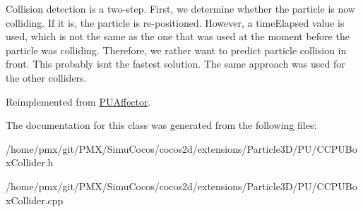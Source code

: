 Collision detection is a two-\/step. First, we determine whether the particle is now colliding. If it is, the particle is re-\/positioned. However, a time\+Elapsed value is used, which is not the same as the one that was used at the moment before the particle was colliding. Therefore, we rather want to predict particle collision in front. This probably isn\textquotesingle{}t the fastest solution. The same approach was used for the other colliders.

Reimplemented from \hyperlink{classPUAffector}{P\+U\+Affector}.



The documentation for this class was generated from the following files\+:\begin{DoxyCompactItemize}
\item 
/home/pmx/git/\+P\+M\+X/\+Simu\+Cocos/cocos2d/extensions/\+Particle3\+D/\+P\+U/C\+C\+P\+U\+Box\+Collider.\+h\item 
/home/pmx/git/\+P\+M\+X/\+Simu\+Cocos/cocos2d/extensions/\+Particle3\+D/\+P\+U/C\+C\+P\+U\+Box\+Collider.\+cpp\end{DoxyCompactItemize}
